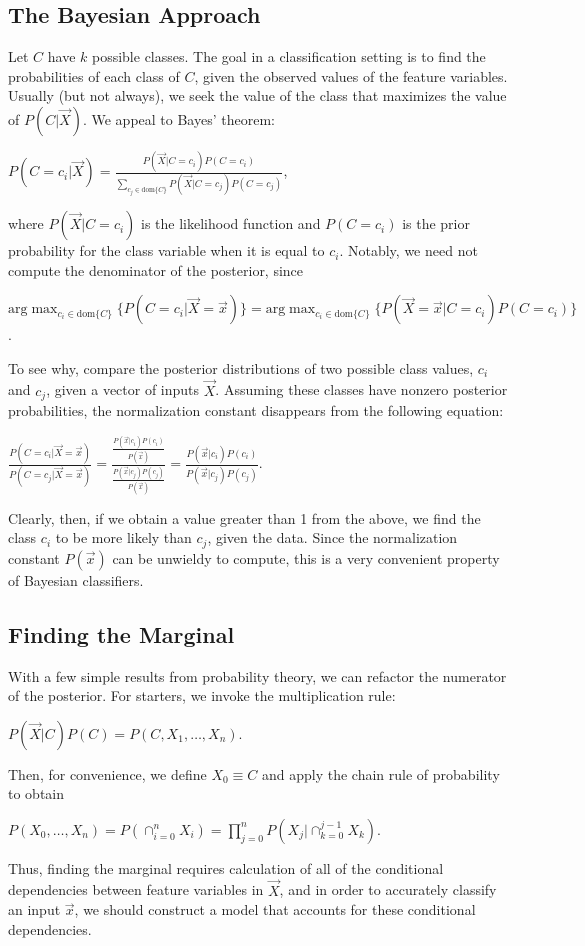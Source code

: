 \documentclass[12pt,twoside]{reedthesis}
\begin{document}
	\subsection*{The Bayesian Approach}
	Let $C$ have $k$ possible classes. 
	The goal in a classification setting is to find the probabilities of each class of $C$, given the observed values of the feature variables. Usually (but not always), we seek the value of the class that maximizes the value of $P(C | \vec{X})$. We appeal to Bayes' theorem:
	\begin{center}
		$P(C = c_i | \vec{X}) = \displaystyle\frac{P(\vec{X} | C = c_i) P(C = c_i)}{\displaystyle\sum_{c_j \in \textrm{dom}\{C\}} P(\vec{X} | C = c_j)P(C=c_j)}$,
	\end{center}
	where $P(\vec{X} | C = c_i)$ is the likelihood function and $P(C = c_i)$ is the prior probability for the class variable when it is equal to $c_i$. Notably, we need not compute the denominator of the posterior, since
	\begin{center} 
	$\displaystyle\textrm{arg}\max_{c_i \in \textrm{dom}\{C\}}{\{ P(C=c_i | \vec{X} = \vec{x}) \}} = \displaystyle\textrm{arg}\max_{c_i \in \textrm{dom}\{C\}}\{ P(\vec{X} = \vec{x} | C = c_i) P(C=c_i) \}$.
	\end{center}
	To see why, compare the posterior distributions of two possible class values, $c_i$ and $c_j$, given a vector of inputs $\vec{X}$. Assuming these classes have nonzero posterior probabilities, the normalization constant disappears from the following equation:
	\begin{center}
		$\displaystyle\frac{P(C=c_i | \vec{X} = \vec{x})}{P(C=c_j | \vec{X} = \vec{x})} = 
		\displaystyle\frac{\displaystyle\frac{P(\vec{x} | c_i)P( c_i)}{P(\vec{x})}}{\displaystyle\frac{P(\vec{x} | c_j) P( c_j)}{P(\vec{x})}} = \frac{P(\vec{x} | c_i) P( c_i)}{P(\vec{x} | c_j) P( c_j)}$.
	\end{center}
	Clearly, then, if we obtain a value greater than 1 from the above, we find the class $c_i$ to be more likely than $c_j$, given the data. Since the normalization constant $P(\vec{x})$ can be unwieldy to compute, this is a very convenient property of Bayesian classifiers. 
	\subsection*{Finding the Marginal}
	With a few simple results from probability theory, we can refactor the numerator of the posterior.
	For starters, we invoke the multiplication rule:
	\begin{center}
		$P(\vec{X} | C) P(C) = P(C, X_1, \ldots, X_n)$.
	\end{center}	
	Then, for convenience, we define $X_0 \equiv C$ and apply the chain rule of probability to obtain
	\begin{center}
		$P(X_0,\ldots,X_n) = P( \displaystyle\cap_{i=0}^{n} X_i) = \displaystyle\prod_{j=0}^{n} P(X_j | \displaystyle\cap_{k=0}^{j-1}X_k)$.
	\end{center}
	Thus, finding the marginal requires calculation of all of the conditional dependencies between feature variables in $\vec{X}$, and in order to accurately classify an input $\vec{x}$, we should construct a model that accounts for these conditional dependencies.
\end{document}
